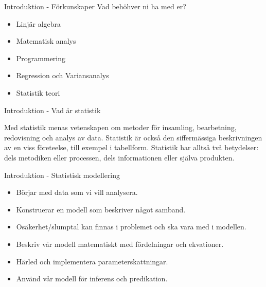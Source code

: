 \documentclass[10pt,english]{beamer}
\begin{document}
\begin{frame}{Introduktion - Förkunskaper}
    Vad behöhver ni ha med er?
    \begin{itemize}
        \item Linjär algebra
        \item Matematisk analys
        \item Programmering
        \item Regression och Variansanalys
        \item Statistik teori
    \end{itemize}
\end{frame}

\begin{frame}{Introduktion - Vad är statistik}
    \begin{bluebox}
        Med statistik menas vetenskapen om metoder för insamling, bearbetning, redovisning och analys av data. Statistik är också den siffermässiga beskrivningen av en viss företeelse, till exempel i tabellform. Statistik har alltså två betydelser: dels metodiken eller processen, dels informationen eller själva produkten.
    \end{bluebox}
\end{frame}

\begin{frame}{Introduktion - Statistisk modellering}
    \begin{itemize}
        \item Börjar med data som vi vill analysera.
        \item Konstruerar en modell som beskriver något samband.
        \item Osäkerhet/slumptal kan finnas i problemet och ska vara med i modellen.
        \item Beskriv vår modell matematiskt med fördelningar och ekvationer.
        \item Härled och implementera parameterskattningar.
        \item Använd vår modell för inferens och predikation.
    \end{itemize}
\end{frame}
\end{document}
